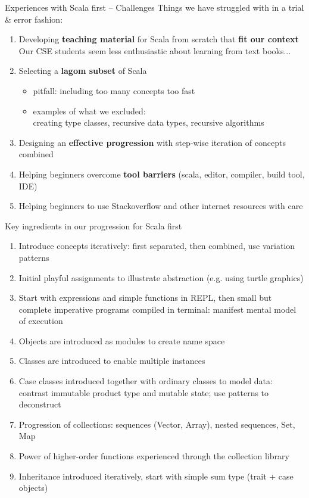 \documentclass[aspectratio=169]{beamer}
\newenvironment{Slide}[1]%
  {\begin{frame}[environment=Slide]{#1}}
  {\end{frame}}%
\begin{document}
\begin{Slide}{Experiences with Scala first -- Challenges}
  Things we have struggled with in a trial \& error fashion:
  \begin{enumerate}
  \item Developing \textbf{teaching material} for Scala from scratch that \textbf{fit our context} \\ {\footnotesize Our CSE students seem less enthusiastic about learning from text books...}
  
  \item Selecting a \textbf{lagom subset} of Scala 
  \begin{itemize}
    \item pitfall: including too many concepts too fast 
    \item examples of what we excluded: \\creating type classes, recursive data types, recursive algorithms 
   \end{itemize}  
  \item Designing an \textbf{effective progression} with step-wise iteration of concepts combined
  \item Helping beginners overcome \textbf{tool barriers} (scala, editor, compiler, build tool, IDE)
  \item Helping beginners to use Stackoverflow and other internet resources with care
  \end{enumerate}  
\end{Slide}


\begin{Slide}{Key ingredients in our progression for Scala first}
 \begin{enumerate}
 \item  Introduce concepts iteratively: first separated, then combined,  use variation patterns  
 \item Initial playful assignments to illustrate abstraction (e.g. using turtle graphics)
 \item Start with expressions and simple functions in REPL, then small but complete imperative programs compiled in terminal: manifest mental model of execution
  \item Objects are introduced as modules to create name space
  \item Classes are introduced to enable multiple instances
  \item Case classes introduced together with ordinary classes to model data: \\
   contrast immutable product type and mutable state; use patterns to deconstruct
  \item Progression of collections: sequences (Vector, Array), nested sequences, Set, Map 
  \item Power of higher-order functions experienced through the collection library
  \item Inheritance introduced iteratively, start with simple sum type (trait + case objects)
\end{enumerate}
\end{Slide}  
\end{document}

